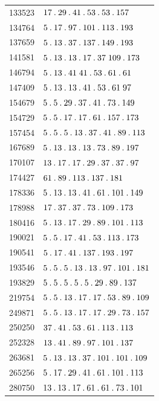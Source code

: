 \begin{longtable}{@{}r|l@{}}
133523 & $17\pdot 29\pdot 41\pdot 53\pdot 53\pdot 157$\\
134764 & $5\pdot 17\pdot 97\pdot 101\pdot 113\pdot 193$\\
137659 & $5\pdot 13\pdot 37\pdot 137\pdot 149\pdot 193$\\
141581 & $5\pdot 13\pdot 13\pdot 17\pdot 37\;109\pdot 173$\\
146794 & $5\pdot 13\pdot 41\;41\pdot 53\pdot 61\pdot 61$\\
147409 & $5\pdot 13\pdot 13\pdot 41\pdot 53\pdot 61\;97$\\
154679 & $5\pdot 5\pdot 29\pdot 37\pdot 41\pdot 73\pdot 149$\\
154729 & $5\pdot 5\pdot 17\pdot 17\pdot 61\pdot 157\pdot 173$\\
157454 & $5\pdot 5\pdot 5\pdot 13\pdot 37\pdot 41\pdot 89\pdot 113$\\
167689 & $5\pdot 13\pdot 13\pdot 13\pdot 73\pdot 89\pdot 197$\\
170107 & $13\pdot 17\pdot 17\pdot 29\pdot 37\pdot 37\pdot 97$\\
174427 & $61\pdot 89\pdot 113\pdot 137\pdot 181$\\
178336 & $5\pdot 13\pdot 13\pdot 41\pdot 61\pdot 101\pdot 149$\\
178988 & $17\pdot 37\pdot 37\pdot 73\pdot 109\pdot 173$\\
180416 & $5\pdot 13\pdot 17\pdot 29\pdot 89\pdot 101\pdot 113$\\
190021 & $5\pdot 5\pdot 17\pdot 41\pdot 53\pdot 113\pdot 173$\\
190541 & $5\pdot 17\pdot 41\pdot 137\pdot 193\pdot 197$\\
193546 & $5\pdot 5\pdot 5\pdot 13\pdot 13\pdot 97\pdot 101\pdot 181$\\
193829 & $5\pdot 5\pdot 5\pdot 5\pdot 5\pdot 29\pdot 89\pdot 137$\\
219754 & $5\pdot 5\pdot 13\pdot 17\pdot 17\pdot 53\pdot 89\pdot 109$\\
249871 & $5\pdot 5\pdot 13\pdot 17\pdot 17\pdot 29\pdot 73\pdot 157$\\
250250 & $37\pdot 41\pdot 53\pdot 61\pdot 113\pdot 113$\\
252328 & $13\pdot 41\pdot 89\pdot 97\pdot 101\pdot 137$\\
263681 & $5\pdot 13\pdot 13\pdot 37\pdot 101\pdot 101\pdot 109$\\
265256 & $5\pdot 17\pdot 29\pdot 41\pdot 61\pdot 101\pdot 113$\\
280750 & $13\pdot 13\pdot 17\pdot 61\pdot 61\pdot 73\pdot 101$\\

\end{longtable}

